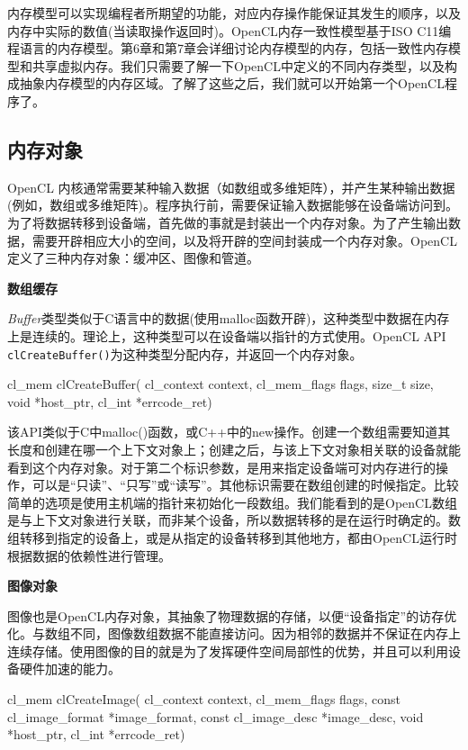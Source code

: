 内存模型可以实现编程者所期望的功能，对应内存操作能保证其发生的顺序，以及内存中实际的数值(当读取操作返回时)。OpenCL内存一致性模型基于ISO C11编程语言的内存模型。第6章和第7章会详细讨论内存模型的内存，包括一致性内存模型和共享虚拟内存。我们只需要了解一下OpenCL中定义的不同内存类型，以及构成抽象内存模型的内存区域。了解了这些之后，我们就可以开始第一个OpenCL程序了。

\subsection{内存对象}

OpenCL 内核通常需要某种输入数据（如数组或多维矩阵），并产生某种输出数据(例如，数组或多维矩阵)。程序执行前，需要保证输入数据能够在设备端访问到。为了将数据转移到设备端，首先做的事就是封装出一个内存对象。为了产生输出数据，需要开辟相应大小的空间，以及将开辟的空间封装成一个内存对象。OpenCL 定义了三种内存对象：缓冲区、图像和管道。

\textbf{数组缓存}

\emph{Buffer}类型类似于C语言中的数据(使用malloc函数开辟)，这种类型中数据在内存上是连续的。理论上，这种类型可以在设备端以指针的方式使用。OpenCL API \texttt{clCreateBuffer()}为这种类型分配内存，并返回一个内存对象。

\begin{codebox}[cpp]
cl_mem
clCreateBuffer(
  cl_context context,
  cl_mem_flags flags,
  size_t size,
  void *host_ptr,
  cl_int *errcode_ret)
\end{codebox}

该API类似于C中malloc()函数，或C++中的new操作。创建一个数组需要知道其长度和创建在哪一个上下文对象上；创建之后，与该上下文对象相关联的设备就能看到这个内存对象。对于第二个标识参数，是用来指定设备端可对内存进行的操作，可以是“只读”、“只写”或“读写”。其他标识需要在数组创建的时候指定。比较简单的选项是使用主机端的指针来初始化一段数组。我们能看到的是OpenCL数组是与上下文对象进行关联，而非某个设备，所以数据转移的是在运行时确定的。数组转移到指定的设备上，或是从指定的设备转移到其他地方，都由OpenCL运行时根据数据的依赖性进行管理。

\textbf{图像对象}

图像也是OpenCL内存对象，其抽象了物理数据的存储，以便“设备指定”的访存优化。与数组不同，图像数组数据不能直接访问。因为相邻的数据并不保证在内存上连续存储。使用图像的目的就是为了发挥硬件空间局部性的优势，并且可以利用设备硬件加速的能力。

\begin{codebox}[cpp]
cl_mem
clCreateImage(
  cl_context context,
  cl_mem_flags flags,
  const cl_image_format *image_format,
  const cl_image_desc *image_desc,
  void *host_ptr,
  cl_int *errcode_ret)
\end{codebox}

